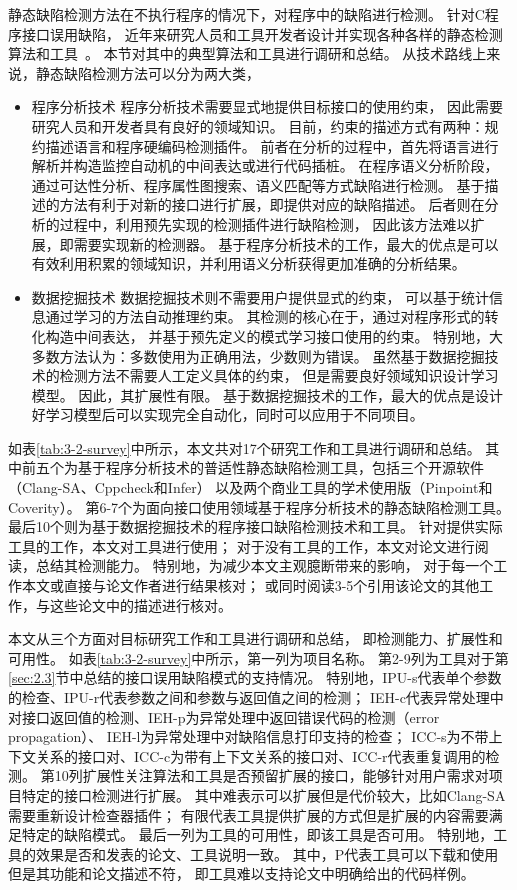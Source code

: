 静态缺陷检测方法在不执行程序的情况下，对程序中的缺陷进行检测。
针对C程序接口误用缺陷，
近年来研究人员和工具开发者设计并实现各种各样的静态检测算法和工具~\cite{16-saner-evaluation, survey18}。
本节对其中的典型算法和工具进行调研和总结。
从技术路线上来说，静态缺陷检测方法可以分为两大类，
\begin{itemize}
	\item {\kaishu 程序分析技术}
	程序分析技术需要显式地提供目标接口的使用约束，
	因此需要研究人员和开发者具有良好的领域知识。
	目前，约束的描述方式有两种：规约描述语言和程序硬编码检测插件。
	前者在分析的过程中，首先将语言进行解析并构造监控自动机的中间表达或进行代码插桩。
	在程序语义分析阶段，通过可达性分析、程序属性图搜索、语义匹配等方式缺陷进行检测。
	基于描述的方法有利于对新的接口进行扩展，即提供对应的缺陷描述。
	后者则在分析的过程中，利用预先实现的检测插件进行缺陷检测，
	因此该方法难以扩展，即需要实现新的检测器。
	基于程序分析技术的工作，最大的优点是可以有效利用积累的领域知识，并利用语义分析获得更加准确的分析结果。
	\item {\kaishu 数据挖掘技术}
	数据挖掘技术则不需要用户提供显式的约束，
	可以基于统计信息通过学习的方法自动推理约束。
	其检测的核心在于，通过对程序形式的转化构造中间表达，
	并基于预先定义的模式学习接口使用的约束。
	特别地，大多数方法认为：多数使用为正确用法，少数则为错误。
	虽然基于数据挖掘技术的检测方法不需要人工定义具体的约束，
	但是需要良好领域知识设计学习模型。
	因此，其扩展性有限。
	基于数据挖掘技术的工作，最大的优点是设计好学习模型后可以实现完全自动化，同时可以应用于不同项目。
\end{itemize}

如表\ref{tab:3-2-survey}中所示，本文共对17个研究工作和工具进行调研和总结。
其中前五个为基于程序分析技术的普适性静态缺陷检测工具，包括三个开源软件（Clang-SA、Cppcheck和Infer）
以及两个商业工具的学术使用版（Pinpoint和Coverity）。
第6-7个为面向接口使用领域基于程序分析技术的静态缺陷检测工具。
最后10个则为基于数据挖掘技术的程序接口缺陷检测技术和工具。
针对提供实际工具的工作，本文对工具进行使用；
对于没有工具的工作，本文对论文进行阅读，总结其检测能力。
特别地，为减少本文主观臆断带来的影响，
对于每一个工作本文或直接与论文作者进行结果核对；
或同时阅读3-5个引用该论文的其他工作，与这些论文中的描述进行核对。



本文从三个方面对目标研究工作和工具进行调研和总结，
即检测能力、扩展性和可用性。
如表\ref{tab:3-2-survey}中所示，第一列为项目名称。
第2-9列为工具对于第\ref{sec:2.3}节中总结的接口误用缺陷模式的支持情况。
特别地，IPU-s代表单个参数的检查、IPU-r代表参数之间和参数与返回值之间的检测；
IEH-c代表异常处理中对接口返回值的检测、IEH-p为异常处理中返回错误代码的检测（error propagation）、
IEH-l为异常处理中对缺陷信息打印支持的检查；
ICC-s为不带上下文关系的接口对、ICC-c为带有上下文关系的接口对、ICC-r代表重复调用的检测。
第10列扩展性关注算法和工具是否预留扩展的接口，能够针对用户需求对项目特定的接口检测进行扩展。
其中难表示可以扩展但是代价较大，比如Clang-SA需要重新设计检查器插件；
有限代表工具提供扩展的方式但是扩展的内容需要满足特定的缺陷模式。
最后一列为工具的可用性，即该工具是否可用。
特别地，工具的效果是否和发表的论文、工具说明一致。
其中，P代表工具可以下载和使用但是其功能和论文描述不符，
即工具难以支持论文中明确给出的代码样例。

